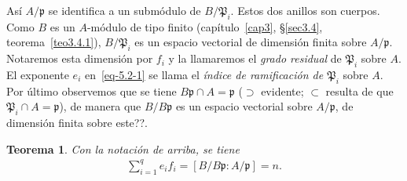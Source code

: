 \documentclass[oneside,bibtotoc,leqno,spanish]{amsbook}
\newcommand{\idl}[1]{\mathfrak{#1}}
\numberwithin{equation}{section}
\theoremstyle{defi}
\theoremstyle{note}
\newtheorem{theorem}{Teorema}
\theoremstyle{rem}
\numberwithin{theorem}{section}
\numberwithin{proposition}{section}
\numberwithin{definition}{section}
\numberwithin{lemma}{section}
\numberwithin{corollary}{section}
\numberwithin{example}{section}
\numberwithin{footnote}{section}%
\begin{document}
As\'i $A/\idl{p}$ se identifica a un subm\'odulo de $B/\idl{P}_{i}$. Estos dos anillos son cuerpos. Como $B$
es un $A$-m\'odulo de tipo finito (cap\'itulo~\ref{cap3}, \S\ref{sec3.4}, teorema~\ref{teo3.4.1}),
$B/\idl{P}_{i}$ es un espacio vectorial
de dimensi\'on finita sobre $A/\idl{p}$. Notaremos esta dimensi\'on por $f_{i}$ y la llamaremos el
{\em grado residual} de $\idl{P}_{i}$ sobre $A$. El exponente $e_{i}$ en~\eqref{eq-5.2-1} se llama el
{\em \'indice de ramificaci\'on de $\idl{P}_{i}$} sobre $A$. Por \'ultimo observemos que se tiene
$B\idl{p}\cap A = \idl{p}$ ($\supset$ evidente; $\subset$ resulta de que $\idl{P}_{i}\cap A=\idl{p}$), de manera
que $B/B\idl{p}$ es un espacio vectorial sobre $A/\idl{p}$, de dimensi\'on finita sobre este??.

\begin{theorem}\label{teo5.2.1}
Con la notaci\'on de arriba, se tiene
\begin{gather}\label{eq-5.2-2}
\sum_{i=1}^{q}e_{i}f_{i}=[B/B\idl{p}:A/\idl{p}]=n.
\end{gather}
\end{theorem}
\end{document}
